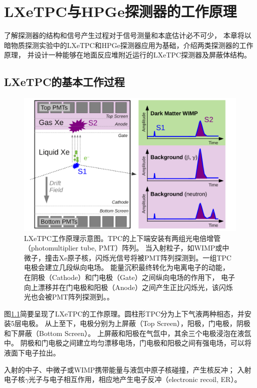 
\chapter{LXeTPC与HPGe探测器的工作原理}

了解探测器的结构和信号产生过程对于信号测量和本底估计必不可少，
本章将以暗物质探测实验中的LXeTPC和HPGe探测器应用为基础，介绍两类探测器的工作原理，
并设计一种能够在地面反应堆附近运行的LXeTPC探测器及屏蔽体结构。

\section{LXeTPC的基本工作过程}

\begin{figure}
    \centering
    \includegraphics[width=0.7\linewidth]{figures/tpc_signals.png}
    \caption{LXeTPC工作原理示意图。TPC的上下端安装有两组光电倍增管（photomultiplier tube, PMT）阵列。
    当入射粒子，如WIMP或中微子，撞击$\mathrm{Xe}$原子核，闪烁光信号将被PMT阵列探测到。一组TPC电极会建立几段纵向电场。
    能量沉积最终转化为电离电子的动能，在阴极（Cathode）和门电极（Gate）之间纵向电场的作用下，
    电子向上漂移并在门电极和阳极（Anode）之间产生正比闪烁光，该闪烁光也会被PMT阵列探测到。\cite{xenon_collaboration_xenon1t_2017}。}
    \label{fig:tpc_principle}
\end{figure}

图\ref{fig:tpc_principle}简要呈现了LXeTPC的工作原理。圆柱形TPC分为上下气液两种相态，并安装5层电极。
从上至下，电极分别为上屏蔽（Top Screen），阳极，门电极，阴极和下屏蔽（Bottom Screen）。
上屏蔽和阳极在气氙中，其余三个电极浸泡在液氙中。
阴极和门电极之间建立均匀漂移电场，门电极和阳极之间有强电场，可以将液面下电子拉出。

入射的中子、中微子或WIMP携带能量与液氙中原子核碰撞，产生核反冲；
入射电子核$\gamma$光子与电子相互作用，相应地产生电子反冲（electronic recoil, ER）。

